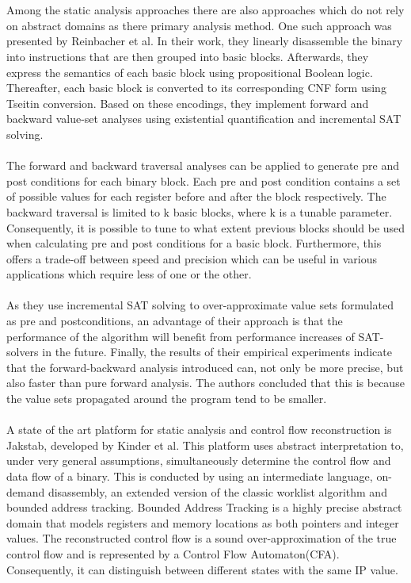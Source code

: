 \documentclass{kththesis}
\begin{document}
\\ \\ 
Among the static analysis approaches there are also approaches which do not rely on abstract domains as there primary analysis method. One such approach was presented by Reinbacher et al\cite{preciseCFGBoolean}. In their work, they linearly disassemble the binary into instructions that are then grouped into basic blocks. Afterwards, they express the semantics of each basic block using propositional Boolean logic. Thereafter, each basic block is converted to its corresponding CNF form using Tseitin conversion. Based on these encodings, they implement forward and backward value-set analyses using existential quantification and incremental SAT solving.
\\ \\
The forward and backward traversal analyses can be applied to generate pre and post conditions for each binary block. Each pre and post condition contains a set of possible values for each register before and after the block respectively. The backward traversal is limited to k basic blocks, where k is a tunable parameter. Consequently, it is possible to tune to what extent previous blocks should be used when calculating pre and post conditions for a basic block. Furthermore, this offers a trade-off between speed and precision which can be useful in various applications which require less of one or the other.
\\ \\
As they use incremental SAT solving to over-approximate value sets formulated as pre and postconditions, an advantage of their approach is that the performance of the algorithm will benefit from performance increases of SAT-solvers in the future. Finally, the results of their empirical experiments indicate that the forward-backward analysis introduced can, not only be more precise, but also faster than pure forward analysis. The authors concluded that this is because the value sets propagated around the program tend to be smaller.
\\ \\
A state of the art platform for static analysis and control flow reconstruction is Jakstab\cite{JakstabGit}, developed by Kinder et al\cite{Jakstab}. This platform uses abstract interpretation to, under very general assumptions, simultaneously determine the control flow and data flow of a binary. This is conducted by using an intermediate language, on-demand disassembly, an extended version of the classic worklist algorithm and bounded address tracking. Bounded Address Tracking is a highly precise abstract domain that models registers and memory locations as both pointers and integer values. The reconstructed control flow is a sound over-approximation of the true control flow and is represented by a Control Flow Automaton(CFA). Consequently, it can distinguish between different states with the same IP value.
\end{document}
